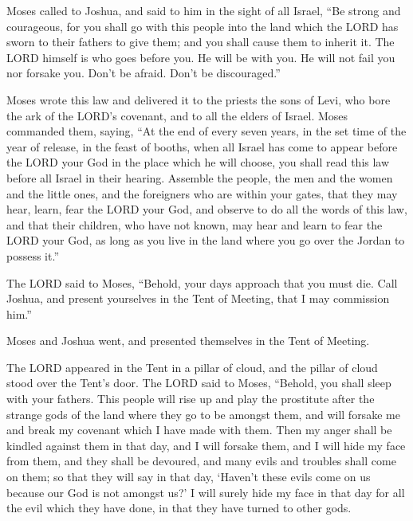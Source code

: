  Moses called to Joshua, and said to him in the sight of
all Israel, ``Be strong and courageous, for you shall go with this
people into the land which the LORD has sworn to their fathers to give
them; and you shall cause them to inherit it.  The LORD
himself is who goes before you. He will be with you. He will not fail
you nor forsake you. Don't be afraid. Don't be discouraged.''

 Moses wrote this law and delivered it to the priests the
sons of Levi, who bore the ark of the LORD's covenant, and to all the
elders of Israel.  Moses commanded them, saying, ``At the
end of every seven years, in the set time of the year of release, in the
feast of booths,  when all Israel has come to appear
before the LORD your God in the place which he will choose, you shall
read this law before all Israel in their hearing. 
Assemble the people, the men and the women and the little ones, and the
foreigners who are within your gates, that they may hear, learn, fear
the LORD your God, and observe to do all the words of this law,
 and that their children, who have not known, may hear
and learn to fear the LORD your God, as long as you live in the land
where you go over the Jordan to possess it.''

 The LORD said to Moses, ``Behold, your days approach
that you must die. Call Joshua, and present yourselves in the Tent of
Meeting, that I may commission him.''

Moses and Joshua went, and presented themselves in the Tent of Meeting.

 The LORD appeared in the Tent in a pillar of cloud, and
the pillar of cloud stood over the Tent's door.  The LORD
said to Moses, ``Behold, you shall sleep with your fathers. This people
will rise up and play the prostitute after the strange gods of the land
where they go to be amongst them, and will forsake me and break my
covenant which I have made with them.  Then my anger
shall be kindled against them in that day, and I will forsake them, and
I will hide my face from them, and they shall be devoured, and many
evils and troubles shall come on them; so that they will say in that
day, `Haven't these evils come on us because our God is not amongst us?'
 I will surely hide my face in that day for all the evil
which they have done, in that they have turned to other gods.


